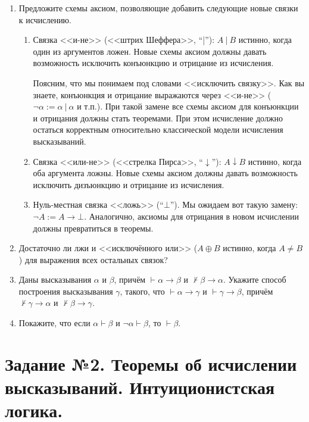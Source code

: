 \documentclass[10pt,a4paper,oneside]{article}
\begin{document}
\begin{enumerate}
\item Предложите схемы аксиом, позволяющие добавить следующие новые связки к исчислению.
\begin{enumerate}
\item Связка <<и-не>> (<<штрих Шеффера>>, ``|''): $A\ |\ B$ истинно, когда один из аргументов ложен. Новые схемы аксиом должны 
давать возможность исключить конъюнкцию и отрицание из исчисления. 

Поясним, что мы понимаем под словами <<исключить связку>>.
Как вы знаете, конъюнкция и отрицание выражаются через <<и-не>> ($\neg \alpha := \alpha\ |\ \alpha$ и т.п.). 
При такой замене все схемы аксиом для конъюнкции и отрицания должны стать теоремами.
При этом исчисление должно остаться корректным относительно классической модели исчисления высказываний.

\item Связка <<или-не>> (<<стрелка Пирса>>, ``$\downarrow$''): $A \downarrow B$ истинно, когда оба аргумента ложны.
Новые схемы аксиом должны давать возможность исключить дизъюнкцию и отрицание из исчисления.
\item Нуль-местная связка <<ложь>> (``$\bot$''). Мы ожидаем вот такую замену: $\neg A := A \rightarrow \bot$.
Аналогично, аксиомы для отрицания в новом исчислении должны превратиться в теоремы. 
\end{enumerate}

\item Достаточно ли лжи и <<исключённого или>> ($A \oplus B$ истинно, когда $A \ne B$) для выражения
всех остальных связок? 

\item Даны высказывания $\alpha$ и $\beta$, причём $\vdash \alpha\rightarrow\beta$ и $\not\vdash\beta\rightarrow\alpha$. 
Укажите способ построения высказывания $\gamma$, такого, что
$\vdash\alpha\rightarrow\gamma$ и $\vdash\gamma\rightarrow\beta$, причём $\not\vdash\gamma\rightarrow\alpha$ и
$\not\vdash\beta\rightarrow\gamma$.

\item Покажите, что если $\alpha \vdash \beta$ и $\neg\alpha\vdash\beta$, то $\vdash\beta$.
\end{enumerate}

\section*{Задание №2. Теоремы об исчислении высказываний. Интуиционистская логика.}
\end{document}
